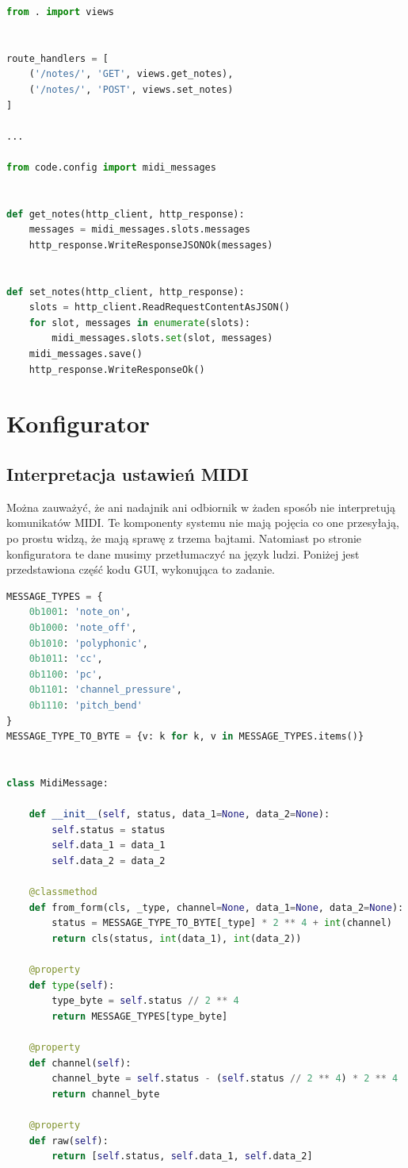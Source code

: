 \documentclass[eng,printmode]{mgr}
\begin{document}
\begin{lstlisting}[language=Python]
from . import views


route_handlers = [
    ('/notes/', 'GET', views.get_notes),
    ('/notes/', 'POST', views.set_notes)
]

...

from code.config import midi_messages


def get_notes(http_client, http_response):
    messages = midi_messages.slots.messages
    http_response.WriteResponseJSONOk(messages)


def set_notes(http_client, http_response):
    slots = http_client.ReadRequestContentAsJSON()
    for slot, messages in enumerate(slots):
        midi_messages.slots.set(slot, messages)
    midi_messages.save()
    http_response.WriteResponseOk()

\end{lstlisting}

\newpage
\section{Konfigurator}

\subsection{Interpretacja ustawień MIDI}

Można zauważyć, że ani nadajnik ani odbiornik w żaden sposób nie interpretują komunikatów MIDI. Te komponenty systemu nie mają pojęcia co one przesyłają, po prostu widzą, że mają sprawę z trzema bajtami. Natomiast po stronie konfiguratora te dane musimy przetłumaczyć na język ludzi. Poniżej jest przedstawiona część kodu GUI, wykonująca to zadanie.


\begin{lstlisting}[language=Python, breaklines=true]
MESSAGE_TYPES = {
    0b1001: 'note_on',
    0b1000: 'note_off',
    0b1010: 'polyphonic',
    0b1011: 'cc',
    0b1100: 'pc',
    0b1101: 'channel_pressure',
    0b1110: 'pitch_bend'
}
MESSAGE_TYPE_TO_BYTE = {v: k for k, v in MESSAGE_TYPES.items()}


class MidiMessage:

    def __init__(self, status, data_1=None, data_2=None):
        self.status = status
        self.data_1 = data_1
        self.data_2 = data_2

    @classmethod
    def from_form(cls, _type, channel=None, data_1=None, data_2=None):
        status = MESSAGE_TYPE_TO_BYTE[_type] * 2 ** 4 + int(channel)
        return cls(status, int(data_1), int(data_2))

    @property
    def type(self):
        type_byte = self.status // 2 ** 4
        return MESSAGE_TYPES[type_byte]

    @property
    def channel(self):
        channel_byte = self.status - (self.status // 2 ** 4) * 2 ** 4
        return channel_byte

    @property
    def raw(self):
        return [self.status, self.data_1, self.data_2]
\end{lstlisting}
\end{document}
